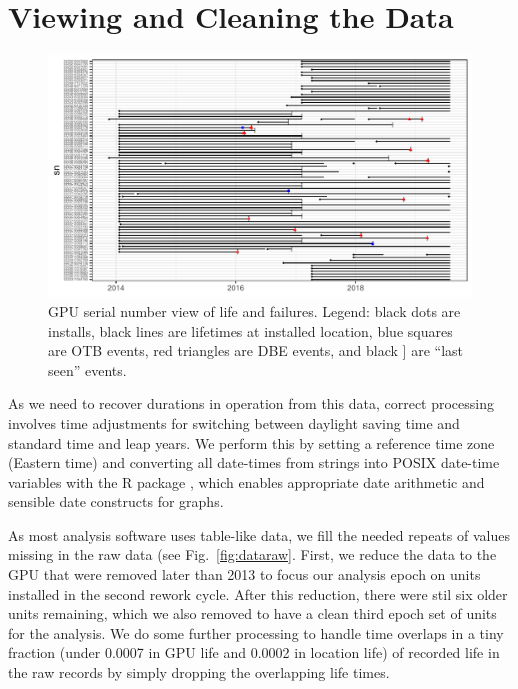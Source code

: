 \section{Viewing and Cleaning the Data}
\label{section:dataclean}
\begin{figure}[bt]
  \includegraphics[width=6.5in]{figs/sample_sn.pdf}
  \caption{GPU serial number view of life and failures. Legend: black
    dots are installs, black lines are lifetimes at installed
    location, blue squares are OTB events, red triangles are DBE
    events, and black ] are ``last seen'' events.}
  \label{fig:gpuview}
\end{figure}
As we need to recover durations in operation from this data, correct
processing involves time adjustments for switching between daylight
saving time and standard time and leap years. We perform this by
setting a reference time zone (Eastern time) and converting all
date-times from strings into POSIX date-time variables with the R
 package \cite{lubridate}, which enables appropriate
date arithmetic and sensible date constructs for graphs.

As most analysis software uses table-like data, we fill the needed
repeats of values missing in the raw data (see
Fig.~\ref{fig:dataraw}. First, we reduce the data to the GPU that were
removed later than 2013 to focus our analysis epoch on units installed
in the second rework cycle. After this reduction, there were stil six
older units remaining, which we also removed to have a clean third
epoch set of units for the analysis. We do some further processing to
handle time overlaps in a tiny fraction (under 0.0007 in GPU life and
0.0002 in location life) of recorded life in the raw records by simply
dropping the overlapping life times.

